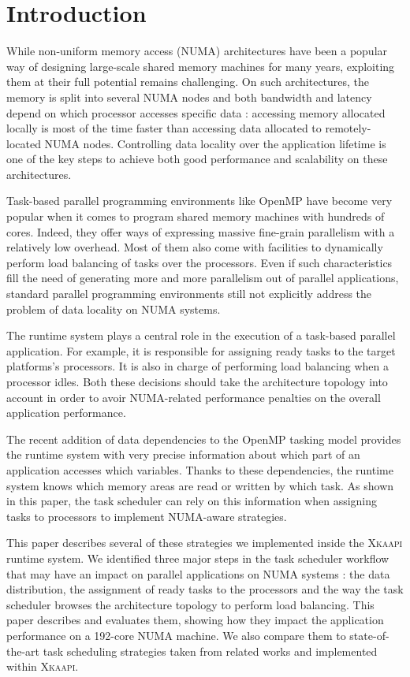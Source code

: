 \documentclass{Styles/llncs}
\newcommand{\kaapi}{\textsc{\mbox{Xkaapi}}\xspace}
\begin{document}
\section{Introduction}

While non-uniform memory access (NUMA) architectures have been a popular way of designing large-scale shared memory machines for many years, exploiting them at their full potential remains challenging.
On such architectures, the memory is split into several NUMA nodes and
both bandwidth and latency depend on which processor accesses specific data :
accessing memory allocated locally is most of the time faster than accessing data allocated to remotely-located NUMA nodes.
Controlling data locality over the application lifetime is one of the key steps to
achieve both good performance and scalability on these architectures.

Task-based parallel programming environments like OpenMP have become very popular when it comes to program shared memory machines with hundreds of cores. Indeed, they offer ways of expressing massive fine-grain parallelism with a relatively low overhead. Most of them also come with facilities to dynamically perform load balancing of tasks over the processors. Even if such characteristics fill the need of generating more and more parallelism out of parallel applications, standard parallel programming environments still not explicitly address the problem of data locality on NUMA systems.

The runtime system plays a central role in the execution of a task-based parallel application.
For example, it is responsible for assigning ready tasks to the target platforms's processors. 
It is also in charge of performing load balancing when a processor idles.
Both these decisions should take the architecture topology into account in order to avoir NUMA-related performance penalties on the overall application performance.

The recent addition of data dependencies to the OpenMP tasking model provides the
runtime system with very precise information about which part of an application accesses which variables. 
Thanks to these dependencies, the runtime system knows which memory areas are read or written by which task. As shown in this paper, the task scheduler can rely on this information when assigning tasks to processors to implement NUMA-aware strategies.

This paper describes several of these strategies we implemented inside the \kaapi runtime system.
We identified three major steps in the task scheduler workflow that may have an impact on parallel applications on NUMA systems : the data distribution, the assignment of ready tasks to the processors and the way the task scheduler browses the architecture topology to perform load balancing.
This paper describes and evaluates them, showing how they impact the application performance on a 192-core NUMA machine.
We also compare them to state-of-the-art task scheduling strategies taken from related works and implemented within \kaapi.
\end{document}
